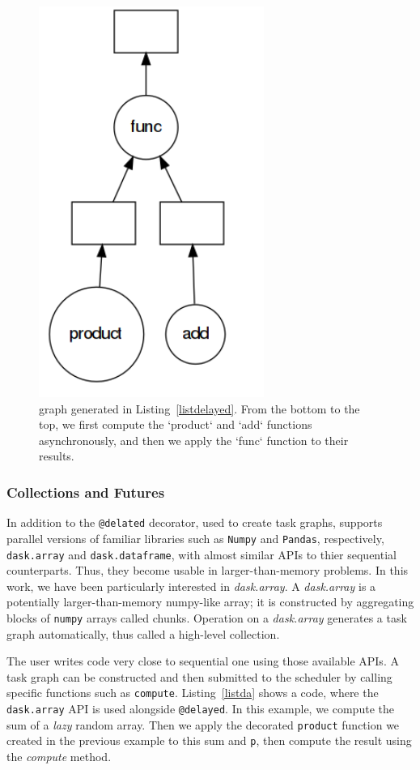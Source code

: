 \begin{figure}[tb]\centering
\includegraphics[scale=0.5]{figures/func.png}
\caption{\dask graph generated in Listing~\ref{listdelayed}. From the bottom to the top, we first compute the `product` and `add` functions asynchronously, and then we apply the `func` function to their results.}
\label{figfunc}
\end{figure}


\subsubsection{\dask Collections and Futures}
In addition to the \texttt{@delated} decorator, used to create task graphs, 
\dask supports parallel versions of familiar libraries such as \texttt{Numpy} and \texttt{Pandas}, respectively, \texttt{dask.array} and \texttt{dask.dataframe}, with almost similar APIs to thier sequential counterparts. 
Thus, they become usable in larger-than-memory problems. In this work, we have been particularly interested in \textit{dask.array}. 
A \textit{dask.array}\cite{rocklin_dask_2015} is a potentially larger-than-memory numpy-like array; it is constructed by aggregating blocks of \texttt{numpy} arrays called chunks. Operation on a \textit{dask.array} generates a task graph automatically, thus called a high-level collection. 

The user writes code very close to sequential one using those available APIs. A task graph can be constructed and then submitted to the scheduler by calling specific functions such as \texttt{compute}. Listing~\ref{listda} shows a \dask code, where the \texttt{dask.array} API is used alongside \texttt{@delayed}. In this example, we compute the sum of a \textit{lazy} random array. Then we apply the decorated \texttt{product} function we created in the previous example to this sum and \texttt{p}, then compute the result using the \textit{compute} method.  

